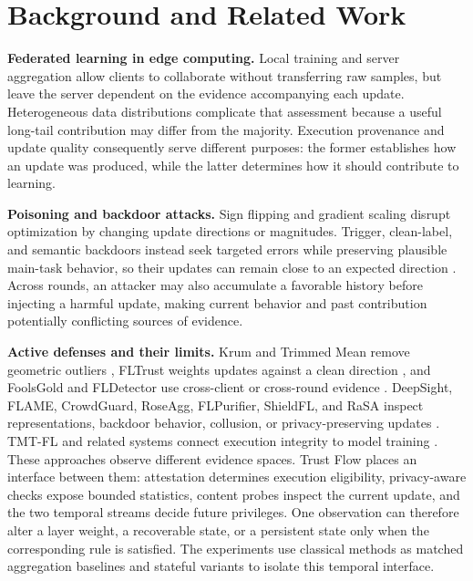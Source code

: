 \documentclass[conference,compsoc]{IEEEtran}
\begin{document}
\section{Background and Related Work}

\textbf{Federated learning in edge computing.} Local training and server aggregation allow clients to collaborate without transferring raw samples, but leave the server dependent on the evidence accompanying each update. Heterogeneous data distributions complicate that assessment because a useful long-tail contribution may differ from the majority. Execution provenance and update quality consequently serve different purposes: the former establishes how an update was produced, while the latter determines how it should contribute to learning.

\textbf{Poisoning and backdoor attacks.} Sign flipping and gradient scaling disrupt optimization by changing update directions or magnitudes. Trigger, clean-label, and semantic backdoors instead seek targeted errors while preserving plausible main-task behavior, so their updates can remain close to an expected direction \cite{bagdasaryan2020backdoor,wang2019neuralcleanse}. Across rounds, an attacker may also accumulate a favorable history before injecting a harmful update, making current behavior and past contribution potentially conflicting sources of evidence.

\textbf{Active defenses and their limits.} Krum and Trimmed Mean remove geometric outliers \cite{blanchard2017krum,yin2018byzantine}, FLTrust weights updates against a clean direction \cite{cao2021fltrust}, and FoolsGold and FLDetector use cross-client or cross-round evidence \cite{fung2020foolsgold,fldetector2022}. DeepSight, FLAME, CrowdGuard, RoseAgg, FLPurifier, ShieldFL, and RaSA inspect representations, backdoor behavior, collusion, or privacy-preserving updates \cite{deepsight2022,flame2022,crowdguard2024,roseagg,flpurifier,shieldfl,wang2025rasa}. TMT-FL and related systems connect execution integrity to model training \cite{lu2025tmt}. These approaches observe different evidence spaces. Trust Flow places an interface between them: attestation determines execution eligibility, privacy-aware checks expose bounded statistics, content probes inspect the current update, and the two temporal streams decide future privileges. One observation can therefore alter a layer weight, a recoverable state, or a persistent state only when the corresponding rule is satisfied. The experiments use classical methods as matched aggregation baselines and stateful variants to isolate this temporal interface.
\end{document}
